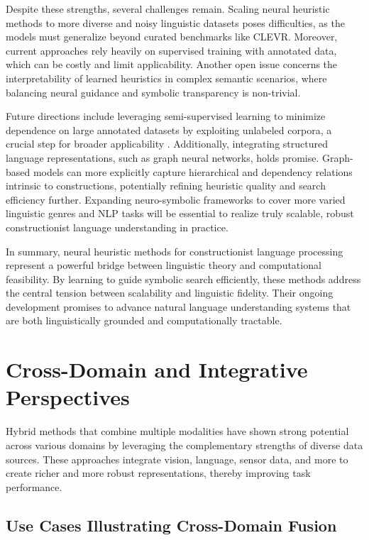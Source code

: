 \documentclass[sigconf]{acmart}
\begin{document}
Despite these strengths, several challenges remain. Scaling neural heuristic methods to more diverse and noisy linguistic datasets poses difficulties, as the models must generalize beyond curated benchmarks like CLEVR. Moreover, current approaches rely heavily on supervised training with annotated data, which can be costly and limit applicability. Another open issue concerns the interpretability of learned heuristics in complex semantic scenarios, where balancing neural guidance and symbolic transparency is non-trivial.

Future directions include leveraging semi-supervised learning to minimize dependence on large annotated datasets by exploiting unlabeled corpora, a crucial step for broader applicability \cite{ref40}. Additionally, integrating structured language representations, such as graph neural networks, holds promise. Graph-based models can more explicitly capture hierarchical and dependency relations intrinsic to constructions, potentially refining heuristic quality and search efficiency further. Expanding neuro-symbolic frameworks to cover more varied linguistic genres and NLP tasks will be essential to realize truly scalable, robust constructionist language understanding in practice.

In summary, neural heuristic methods for constructionist language processing represent a powerful bridge between linguistic theory and computational feasibility. By learning to guide symbolic search efficiently, these methods address the central tension between scalability and linguistic fidelity. Their ongoing development promises to advance natural language understanding systems that are both linguistically grounded and computationally tractable.

\section{Cross-Domain and Integrative Perspectives}

Hybrid methods that combine multiple modalities have shown strong potential across various domains by leveraging the complementary strengths of diverse data sources. These approaches integrate vision, language, sensor data, and more to create richer and more robust representations, thereby improving task performance.

\subsection{Use Cases Illustrating Cross-Domain Fusion}
\end{document}
